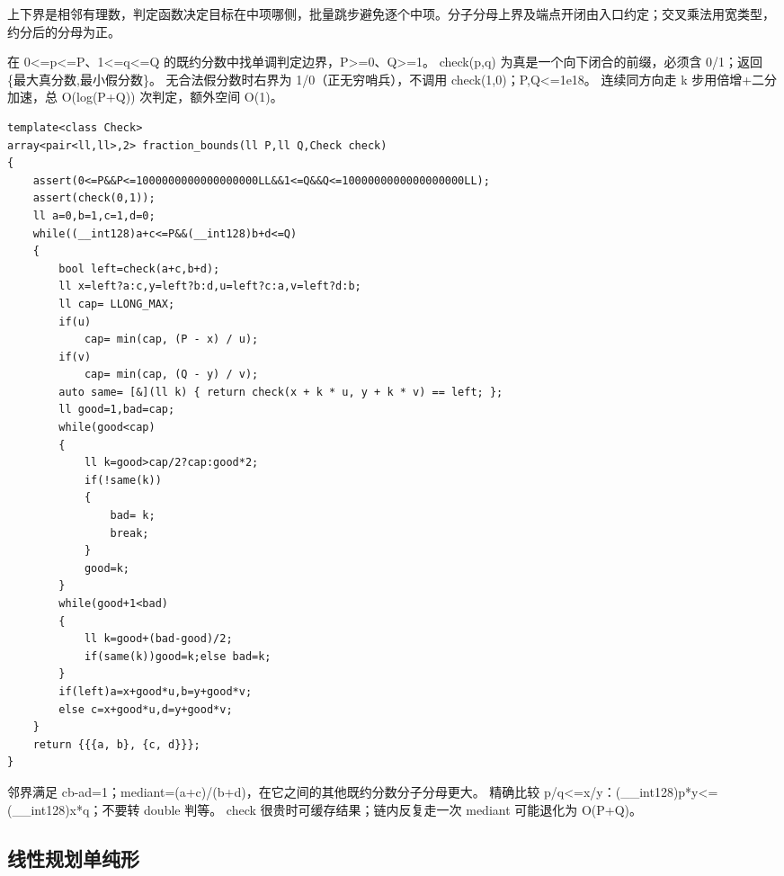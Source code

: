 \documentclass[UTF8,fontset=fandol,a4paper,twoside]{ctexart}
\newcommand{\note}[1]{{\fontsize{10}{12}\selectfont #1\par}}
\begin{document}
\begin{multicols}{2}
\note{上下界是相邻有理数，判定函数决定目标在中项哪侧，批量跳步避免逐个中项。分子分母上界及端点开闭由入口约定；交叉乘法用宽类型，约分后的分母为正。}
\note{在 0<\allowbreak{}=\allowbreak{}p<\allowbreak{}=\allowbreak{}P、1<\allowbreak{}=\allowbreak{}q<\allowbreak{}=\allowbreak{}Q 的既约分数中找单调判定边界，P>\allowbreak{}=\allowbreak{}0、Q>\allowbreak{}=\allowbreak{}1。 check(\allowbreak{}p,\allowbreak{}q)\allowbreak{} 为真是一个向下闭合的前缀，必须含 0/\allowbreak{}1；返回 \{最大真分数,\allowbreak{}最小假分数\}。 无合法假分数时右界为 1/\allowbreak{}0（正无穷哨兵），不调用 check(\allowbreak{}1,\allowbreak{}0)\allowbreak{}；P,\allowbreak{}Q<\allowbreak{}=\allowbreak{}1e18。 连续同方向走 k 步用倍增+\allowbreak{}二分加速，总 O(\allowbreak{}log(\allowbreak{}P+\allowbreak{}Q)\allowbreak{})\allowbreak{} 次判定，额外空间 O(\allowbreak{}1)\allowbreak{}。}
\begin{lstlisting}
template<class Check>
array<pair<ll,ll>,2> fraction_bounds(ll P,ll Q,Check check)
{
    assert(0<=P&&P<=1000000000000000000LL&&1<=Q&&Q<=1000000000000000000LL);
    assert(check(0,1));
    ll a=0,b=1,c=1,d=0;
    while((__int128)a+c<=P&&(__int128)b+d<=Q)
    {
        bool left=check(a+c,b+d);
        ll x=left?a:c,y=left?b:d,u=left?c:a,v=left?d:b;
        ll cap= LLONG_MAX;
        if(u)
            cap= min(cap, (P - x) / u);
        if(v)
            cap= min(cap, (Q - y) / v);
        auto same= [&](ll k) { return check(x + k * u, y + k * v) == left; };
        ll good=1,bad=cap;
        while(good<cap)
        {
            ll k=good>cap/2?cap:good*2;
            if(!same(k))
            {
                bad= k;
                break;
            }
            good=k;
        }
        while(good+1<bad)
        {
            ll k=good+(bad-good)/2;
            if(same(k))good=k;else bad=k;
        }
        if(left)a=x+good*u,b=y+good*v;
        else c=x+good*u,d=y+good*v;
    }
    return {{{a, b}, {c, d}}};
}
\end{lstlisting}
\note{邻界满足 cb-\allowbreak{}ad=\allowbreak{}1；mediant=\allowbreak{}(\allowbreak{}a+\allowbreak{}c)\allowbreak{}/\allowbreak{}(\allowbreak{}b+\allowbreak{}d)\allowbreak{}，在它之间的其他既约分数分子分母更大。 精确比较 p/\allowbreak{}q<\allowbreak{}=\allowbreak{}x/\allowbreak{}y：(\allowbreak{}\_\_int128)\allowbreak{}p*y<\allowbreak{}=\allowbreak{}(\allowbreak{}\_\_int128)\allowbreak{}x*q；不要转 double 判等。 check 很贵时可缓存结果；链内反复走一次 mediant 可能退化为 O(\allowbreak{}P+\allowbreak{}Q)\allowbreak{}。}
\subsection{线性规划单纯形}


\end{multicols}
\end{document}
